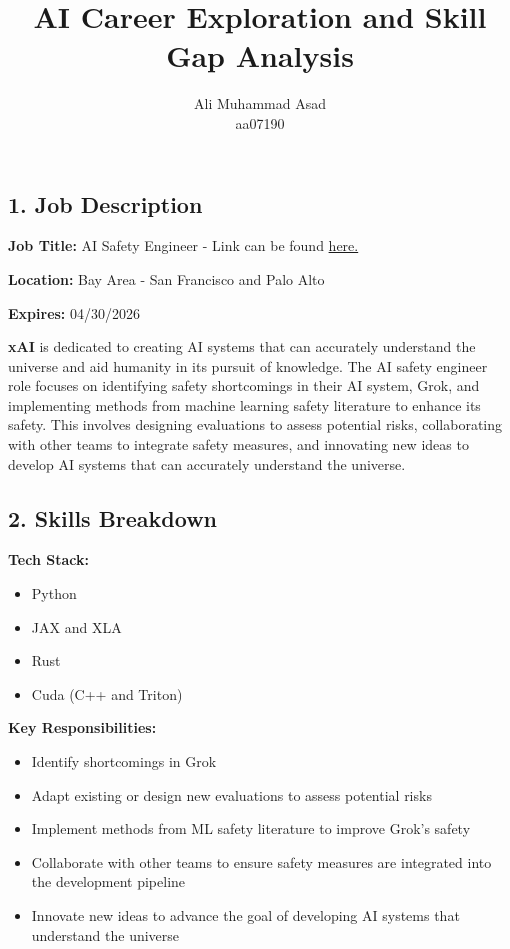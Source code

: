 \documentclass{article}
\title{AI Career Exploration and Skill Gap Analysis}
\author{Ali Muhammad Asad \\ aa07190}
\date{} %
\theoremstyle{mytheoremstyle}
\theoremstyle{mytheoremstyle}
\theoremstyle{myproblemstyle}
\begin{document}
    \maketitle

\subsection*{1. Job Description}

\textbf{Job Title:} AI Safety Engineer - Link can be found \href{https://boards.greenhouse.io/xai/jobs/4531703007}{here.}

\noindent \textbf{Location:} Bay Area - San Francisco and Palo Alto

\noindent \textbf{Expires:} 04/30/2026

\noindent \textbf{xAI} is dedicated to creating AI systems that can accurately understand the universe and aid humanity in its pursuit of knowledge. The AI safety engineer role focuses on identifying safety shortcomings in their AI system, Grok, and implementing methods from machine learning safety literature to enhance its safety. This involves designing evaluations to assess potential risks, collaborating with other teams to integrate safety measures, and innovating new ideas to develop AI systems that can accurately understand the universe.

\subsection*{2. Skills Breakdown}

\textbf{Tech Stack:}
\begin{itemize}
    \item Python
    \item JAX and XLA
    \item Rust
    \item Cuda (C++ and Triton)
\end{itemize}

\noindent \textbf{Key Responsibilities:}
\begin{itemize}
    \item Identify shortcomings in Grok
    \item Adapt existing or design new evaluations to assess potential risks
    \item Implement methods from ML safety literature to improve Grok's safety
    \item Collaborate with other teams to ensure safety measures are integrated into the development pipeline
    \item Innovate new ideas to advance the goal of developing AI systems that understand the universe
\end{itemize}
\end{document}
